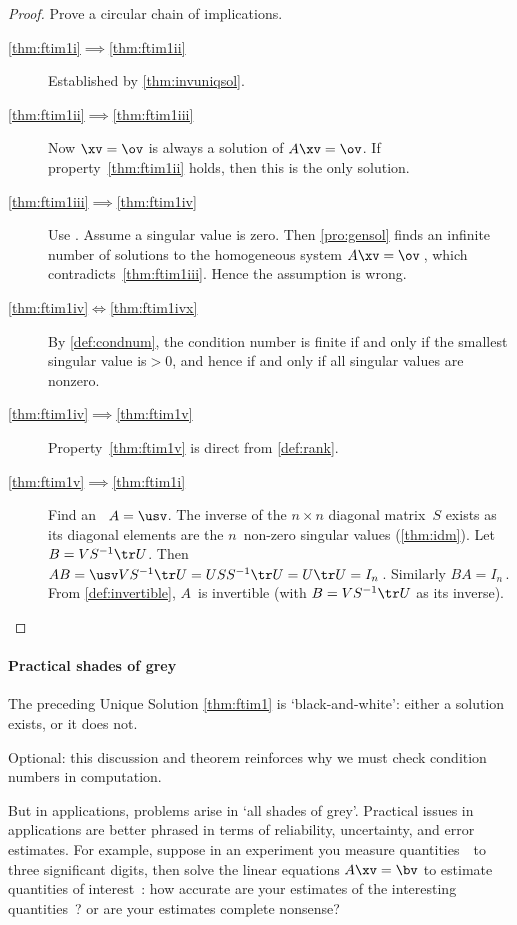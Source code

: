 \begin{proof} 
Prove a circular chain of implications. 
\begin{description}
\item[\ref{thm:ftim1i}$\implies$\ref{thm:ftim1ii}]
Established by \autoref{thm:invuniqsol}.
\item[\ref{thm:ftim1ii}$\implies$\ref{thm:ftim1iii}]
Now \(\xv=\ov\) is always a solution of \(A\xv=\ov\).  If property~\ref{thm:ftim1ii} holds, then this is the only solution.
\item[\ref{thm:ftim1iii}$\implies$\ref{thm:ftim1iv}]
Use .  
Assume a singular value is zero. 
Then \autoref{pro:gensol} finds an infinite number of solutions to the homogeneous system \(A\xv=\ov\)\,, which contradicts~\ref{thm:ftim1iii}.
Hence the assumption is wrong.
\item[\ref{thm:ftim1iv}$\iff$\ref{thm:ftim1ivx}]
By \autoref{def:condnum}, the condition number is finite if and only if the smallest singular value is\({}>0\), and hence if and only if all singular values are nonzero.
\item[\ref{thm:ftim1iv}$\implies$\ref{thm:ftim1v}]
Property~\ref{thm:ftim1v} is direct from \autoref{def:rank}.
\item[\ref{thm:ftim1v}$\implies$\ref{thm:ftim1i}]
Find an \svd\ \(A=\usv\).  
The inverse of the \(n\times n\) diagonal matrix~\(S\) exists as its diagonal elements are the \(n\)~non-zero singular values (\autoref{thm:idm}). 
Let \(B=VS^{-1}\tr U\).
Then \(AB=\usv VS^{-1}\tr U=USS^{-1}\tr U=U\tr U=I_n\)\,.  Similarly \(BA=I_n\)\,.  
From \autoref{def:invertible}, \(A\)~is invertible (with \(B=VS^{-1}\tr U\) as its inverse).
\end{description}
\end{proof}



\paragraph{Practical shades of grey}
The preceding Unique Solution \autoref{thm:ftim1} is `black-and-white': either a solution exists, or it does not.
\begin{aside}
Optional: this discussion and theorem reinforces why we must check condition numbers in computation.
\end{aside}%
But in applications, problems arise in `all shades of grey'.
Practical issues in applications are better phrased in terms of reliability, uncertainty, and error estimates.
For example, suppose in an experiment you measure quantities~\bv\ to three significant digits, then solve the linear equations \(A\xv=\bv\) to estimate quantities of interest~\xv: how accurate are your estimates of the interesting quantities~\xv? or are your estimates complete nonsense?



